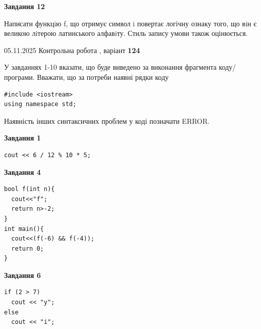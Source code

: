 \documentclass[12pt, ukrainian]{article}
\begin{document}
{\begin {large}
\begin{minipage}[t]{11.0cm}
\begin{center}
\textbf{Завдання 12}
\end{center}

Написати функцiю f, що отримує символ i повертає логічну ознаку того, що вiн є великою лiтерою латинського алфавiту. Стиль запису умови також оцінюється.\par

\end{minipage}

\end {large}}
\newpage

{\Large{05.11.2025 Контрольна робота , варіант  \No \textbf { 124 }\par}}
{
\begin {large}
У завданнях 1-10 вказати, що буде виведено за виконання фрагмента коду/про\-гра\-ми.
Вважати, що за потреби наявні рядки коду
\begin{verbatim}
#include <iostream>
using namespace std;
\end{verbatim}
Наявність інших синтаксичних проблем у коді позначати ERROR.

\begin{minipage}[t]{7.0cm}

\begin{center}
\textbf{Завдання 1}
\end{center}
\vspace{-8mm}

\begin{verbatim}
cout << 6 / 12 % 10 * 5;
\end{verbatim}



\begin{center}
\textbf{Завдання 4}
\end{center}
\vspace{-8mm}

\begin{verbatim}
bool f(int n){
  cout<<"f";
  return n>-2;
}
int main(){
  cout<<(f(-6) && f(-4));
  return 0;
}
\end{verbatim}



\begin{center}
\textbf{Завдання 6}
\end{center}
\vspace{-8mm}

\begin{verbatim}
if (2 > 7)
  cout << "y";
else
  cout << "i";
\end{verbatim}




\end{minipage}
\end{large}}
\end{document}
